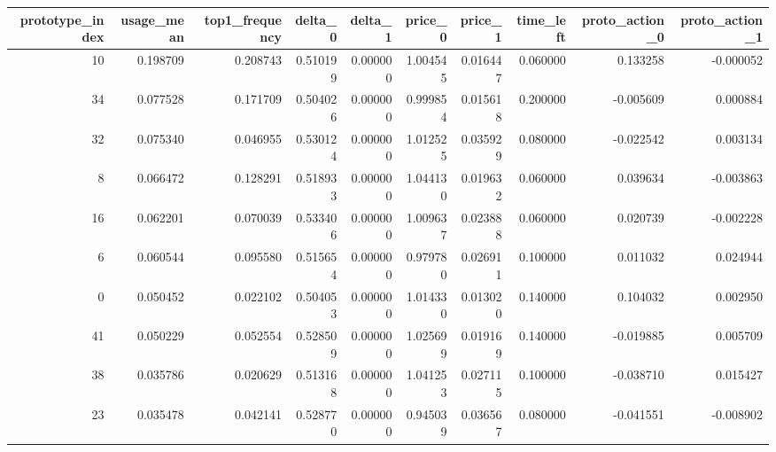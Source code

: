 \begin{tabular}{rrrrrrrrrr}
\toprule
prototype_index & usage_mean & top1_frequency & delta_0 & delta_1 & price_0 & price_1 & time_left & proto_action_0 & proto_action_1 \\
\midrule
10 & 0.198709 & 0.208743 & 0.510199 & 0.000000 & 1.004545 & 0.016447 & 0.060000 & 0.133258 & -0.000052 \\
34 & 0.077528 & 0.171709 & 0.504026 & 0.000000 & 0.999854 & 0.015618 & 0.200000 & -0.005609 & 0.000884 \\
32 & 0.075340 & 0.046955 & 0.530124 & 0.000000 & 1.012525 & 0.035929 & 0.080000 & -0.022542 & 0.003134 \\
8 & 0.066472 & 0.128291 & 0.518933 & 0.000000 & 1.044130 & 0.019632 & 0.060000 & 0.039634 & -0.003863 \\
16 & 0.062201 & 0.070039 & 0.533406 & 0.000000 & 1.009637 & 0.023888 & 0.060000 & 0.020739 & -0.002228 \\
6 & 0.060544 & 0.095580 & 0.515654 & 0.000000 & 0.979780 & 0.026911 & 0.100000 & 0.011032 & 0.024944 \\
0 & 0.050452 & 0.022102 & 0.504053 & 0.000000 & 1.014330 & 0.013020 & 0.140000 & 0.104032 & 0.002950 \\
41 & 0.050229 & 0.052554 & 0.528509 & 0.000000 & 1.025699 & 0.019169 & 0.140000 & -0.019885 & 0.005709 \\
38 & 0.035786 & 0.020629 & 0.513168 & 0.000000 & 1.041253 & 0.027115 & 0.100000 & -0.038710 & 0.015427 \\
23 & 0.035478 & 0.042141 & 0.528770 & 0.000000 & 0.945039 & 0.036567 & 0.080000 & -0.041551 & -0.008902 \\
\bottomrule
\end{tabular}
